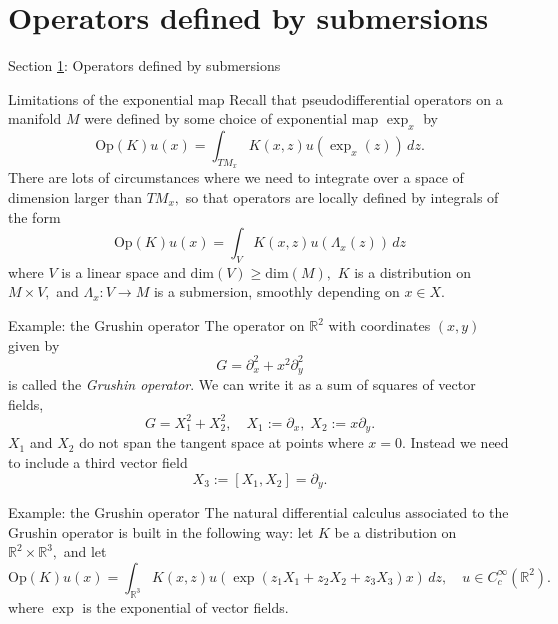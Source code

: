 \documentclass{beamer}
\numberwithin{equation}{section}
\theoremstyle{plain}
\theoremstyle{plain}
\theoremstyle{definition}
\theoremstyle{plain}
\theoremstyle{plain}
\theoremstyle{definition}
\newcommand{\Rl}{\mathbb{R}}
\newcommand{\Op}{\mathrm{Op}}
\begin{document}
\section{Operators defined by submersions}\label{submersion_section}

\begin{frame}
    \huge{Section \ref{submersion_section}: Operators defined by submersions}
\end{frame}

\begin{frame}{Limitations of the exponential map}
    Recall that pseudodifferential operators on a manifold $M$ were defined by some choice of exponential map $\exp_x$ by 
    \[
        \Op(K)u(x) = \int_{TM_x} K(x,z)u(\exp_x(z))\,dz.
    \]
    There are lots of circumstances where we need to integrate over a space of dimension larger than $TM_x,$ so that operators are locally defined by integrals of the form
    \[
        \Op(K)u(x) = \int_V K(x,z)u(\Lambda_x(z))\,dz
    \]
    where $V$ is a linear space and $\mathrm{dim}(V)\geq \mathrm{dim}(M),$ $K$ is a distribution on $M\times V,$ and $\Lambda_x:V\to M$ is a submersion, smoothly depending on $x \in X.$   
\end{frame}

\begin{frame}{Example: the Grushin operator}
    The operator on $\Rl^2$ with coordinates $(x,y)$ given by
    \[
        G = \partial_x^2+x^2\partial_y^2
    \]
    is called the \emph{Grushin operator}. We can write it as a sum of squares of vector fields,
    \[
        G = X_1^2+X_2^2,\quad X_1 := \partial_x,\; X_2 := x\partial_y.
    \]
    $X_1$ and $X_2$ do not span the tangent space at points where $x=0.$ Instead we need to include a third vector field
    \[
        X_3 := [X_1,X_2] = \partial_y.
    \]
\end{frame}

\begin{frame}{Example: the Grushin operator}
    The natural differential calculus associated to the Grushin operator is built in the following way: let $K$ be a distribution on $\Rl^2\times \Rl^3,$ and let
    \[
        \Op(K)u(x) = \int_{\Rl^3} K(x,z)u(\exp(z_1X_1+z_2X_2+z_3X_3)x)\,dz,\quad u\in C^\infty_c(\Rl^2).
    \]
    where $\exp$ is the exponential of vector fields.
\end{frame}
\end{document}
